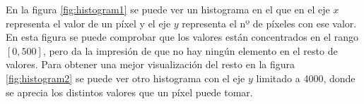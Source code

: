 En la figura \ref{fig:histogram1} se puede ver un histograma en el que en el eje $ x $ representa el valor de un píxel y el eje $ y $ representa el nº de píxeles con ese valor. En esta figura se puede comprobar que los valores están concentrados en el rango $ [0,500] $, pero da la impresión de que no hay ningún elemento en el resto de valores. Para obtener una mejor visualización del resto en la figura \ref{fig:histogram2} se puede ver otro histograma con el eje $ y $ limitado a 4000, donde se aprecia los distintos valores que un píxel puede tomar. 

